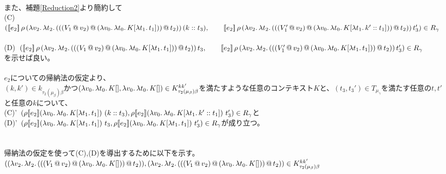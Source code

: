    \\
   また、補題\ref{Reduction2}より簡約して\\
 (C)\ $([\![{e_2}]\!]\,\rho\,(\lambda{v_2}.\,{\lambda{t_2}.\,{({({({V_1}\,@\,{v_2})}\,@\,{(\lambda{v_0}.\,{\lambda{t_0}.\,{K[\lambda{t_1}.\,{t_1}]}})})}\,@\,{t_2})}})\,(k::t_3),\\
   \qquad  [\![{e_2}]\!]\,\rho\,(\lambda{v_2}.\,{\lambda{t_2}.\,{({({({V_1'}\,@\,{v_2})}\,@\,{(\lambda{v_0}.\,{\lambda{t_0}.\,{K[\lambda{t_1}.\,{k'::t_1}]}})})}\,@\,{t_2})}})\,t_3')\in R_{\gamma}$\\
            \\
 (D)\ $([\![{e_2}]\!]\,\rho\,(\lambda{v_2}.\,{\lambda{t_2}.\,{({({({V_1}\,@\,{v_2})}\,@\,{(\lambda{v_0}.\,{\lambda{t_0}.\,{K[\lambda{t_1}.\,{t_1}]}})})}\,@\,{t_2})}})\,t_3,\\
   \qquad  [\![{e_2}]\!]\,\rho\,(\lambda{v_2}.\,{\lambda{t_2}.\,{({({({V_1'}\,@\,{v_2})}\,@\,{(\lambda{v_0}.\,{\lambda{t_0}.\,{K[\lambda{t_1}.\,{t_1}]}})})}\,@\,{t_2})}})\,t_3')\in R_{\gamma}$\\
  を示せば良い。\\
  \\
  $e_2$についての帰納法の仮定より、\\
  $(k,k')\in k_{\tau_2(\mu_{\beta})\beta}$かつ$(\lambda{v_0}.\,{\lambda{t_0}.\,{K[]}}, \lambda{v_0}.\,{\lambda{t_0}.\,{K[]}})\in  K^{kk'}_{\tau_2(\mu_{\beta})\beta}$を満たすような任意のコンテキスト$K$と、$(t_3, t_3') \in T_{\mu_{\gamma}}$を満たす任意の$t, t'$と任意の$k$について、\\
  (C)'\ $(\rho \CPSTh{e_2} \LamP{v_0}{\Lam{t_0}{K[\Lam{t_1}{t_1}]}}\ (\Cons{k}{t_3}), \rho \CPSTh{e_2} \LamP{v_0}{\Lam{t_0}{K[\Lam{t_1}{\Cons{k'}{t_1}}]}}\ t_3')\in R_{\gamma}$と\\
  (D)'\ $(\rho [\![{e_2}]\!] (\lambda{v_0}.\,{\lambda{t_0}.\,{K[\lambda{t_1}.\,{t_1}]}})\ t_3, \rho [\![{e_2}]\!] (\lambda{v_0}.\,{\lambda{t_0}.\,{K[\lambda{t_1}.\,{t_1}]}})\ t_3')\in R_{\gamma}$が成り立つ。\\
  \\
  \\
  帰納法の仮定を使って(C),(D)を導出するために以下を示す。\\
  $((\lambda{v_2}.\,{\lambda{t_2}.\,{({({({V_1}\,@\,{v_2})}\,@\,{(\lambda{v_0}.\,{\lambda{t_0}.\,{K[]}})})}\,@\,{t_2})}}),\\
   (\lambda{v_2}.\,{\lambda{t_2}.\,{({({({V_1}\,@\,{v_2})}\,@\,{(\lambda{v_0}.\,{\lambda{t_0}.\,{K[]}})})}\,@\,{t_2})}})\in K^{kk'}_{\tau_2(\mu_{\beta})\beta}$\\
